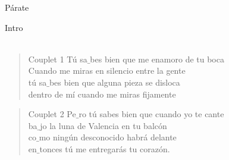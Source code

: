 \begin{song}{Párate}

\begin{instrumental}{Intro}
 \measure{}  \\
  \\
\end{instrumental}

\begin{verse}{Couplet 1}
 \hspace{1em} Tú sa$\_$bes bien que me enamoro de tu boca\\
 \hspace{1.3em}Cuando me miras en silencio entre la gente\\
 \hspace{1em} tú sa$\_$bes bien que alguna pieza se disloca\\
 \hspace{1em} dentro de mí cuando me miras fijamente
\end{verse}

\begin{verse}{Couplet 2}
 \hspace{1em} Pe$\_$ro tú sabes bien que cuando yo te cante\\
 \hspace{1em} ba$\_$jo la luna de Valencia en tu balcón\\
 \hspace{1em} co$\_$mo ningún desconocido habrá delante\\
 \hspace{1em} en$\_$tonces tú me entregarás tu corazón.
\end{verse}


\end{song}
